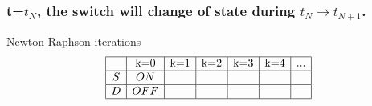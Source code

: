  \frame
{

\frametitle{t=$t_N$, the switch will change of state during $t_N \to t_{N+1}$.}

  \begin{figure}[!h]
   \centerline{
   \scalebox{0.9}{
    
    }
 } 
 \end{figure}

 \begin{block}{Newton-Raphson iterations}
\begin{equation}
\begin{array}{|c|c|c|c|c|c|c|}
\hline
&$k=0$&$k=1$&$k=2$&$k=3$&$k=4$&...\\
\hline
S&ON&&&&&\\
\hline
D&OFF&&&&&\\
\hline
\end{array}
\end{equation}
\end{block}


 }

